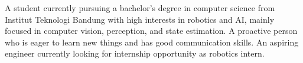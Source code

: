 

\begin{cvparagraph}
A student currently pursuing a bachelor's degree in computer science from Institut Teknologi Bandung with high interests in robotics and AI, mainly focused in computer vision, perception, and state estimation. A proactive person who is eager to learn new things and has good communication skills. An aspiring engineer currently looking for internship opportunity as robotics intern.
\end{cvparagraph}

